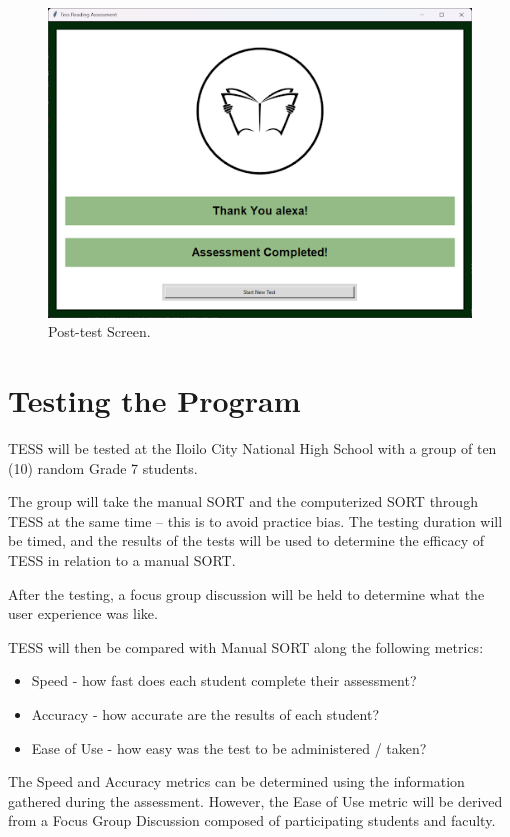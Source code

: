 \begin{figure}[!]
   \centering
   \includegraphics[scale = 0.6]{figures/Post-test-Screen.png}
   \caption{Post-test Screen.}
    \label{fig:posttestScreen}
\end{figure}

{\clearpage}

\section{Testing the Program}
TESS will be tested at the Iloilo City National High School with a group of ten (10) random Grade 7 students.

The group will take the manual SORT and the computerized SORT through TESS at the same time -- this is to avoid practice bias. The testing duration will be timed, and the results of the tests will be used to determine the efficacy of TESS in relation to a manual SORT.

After the testing, a focus group discussion will be held to determine what the user experience was like.

TESS will then be compared with Manual SORT along the following metrics:
\begin{itemize}
\item Speed - how fast does each student complete their assessment?
\item Accuracy - how accurate are the results of each student?
\item Ease of Use - how easy was the test to be administered / taken?
\end{itemize}

The Speed and Accuracy metrics can be determined using the information gathered during the assessment. However, the Ease of Use metric will be derived from a Focus Group Discussion composed of participating students and faculty.


